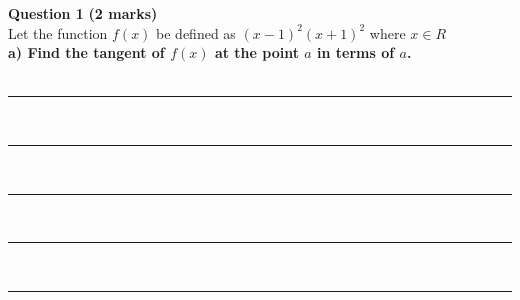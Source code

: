 \documentclass[a4paper,12pt]{article}
\begin{document}
\noindent \textbf{Question 1} \hfill \textbf{(2 marks)} \\[0.3cm]
Let the function \(f(x)\) be defined as \((x-1)^2(x+1)^2\) where \(x \in R\) \\ [0.3cm]
\noindent \textbf{a) Find the tangent of \( f(x) \) at the point \( a \) in terms of \(a\).}\hfill \\[0.1cm] \hfill {} \\[1cm]
\rule{\textwidth}{0.5pt} \\[0.7cm]
\rule{\textwidth}{0.5pt} \\[0.7cm]
\rule{\textwidth}{0.5pt} \\[0.7cm]
\rule{\textwidth}{0.5pt} \\[0.7cm]
\rule{\textwidth}{0.5pt} \\[1.5cm]
\end{document}
